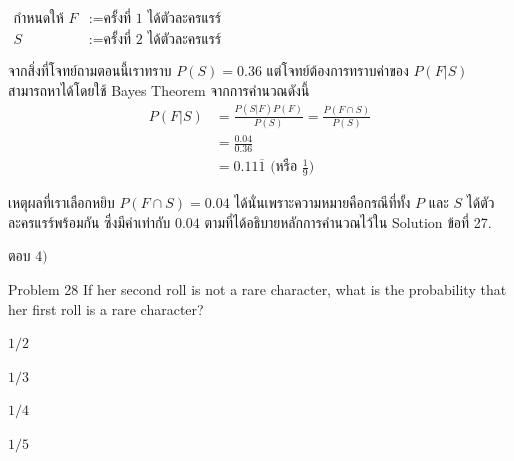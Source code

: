 \documentclass[11pt]{scrartcl}
\begin{document}
\begin{solutionbox}
  \begin{flushleft}
  $\begin{aligned}
    \text{กำหนดให้ } F &:= \text{ครั้งที่ 1 ได้ตัวละครแรร์} \\
    S &:= \text{ครั้งที่ 2 ได้ตัวละครแรร์}
  \end{aligned}$
  \end{flushleft}

  จากสิ่งที่โจทย์ถามตอนนี้เราทราบ $P(S)=0.36$ แต่โจทย์ต้องการทราบค่าของ $P(F|S)$ สามารถหาได้โดยใช้ Bayes Theorem จากการคำนวณดังนี้
  \begin{align*}
      P(F|S) &= \frac{P(S|F)P(F)}{P(S)} = \frac{P(F \cap S)}{P(S)} \\
             &= \frac{0.04}{0.36} \\
             &= 0.11\overline{1} \text{ (หรือ $\frac{1}{9}$)}
  \end{align*}

  เหตุผลที่เราเลือกหยิบ $P(F \cap S) = 0.04$ ได้นั่นเพราะความหมายคือกรณีที่ทั้ง $P$ และ $S$ ได้ตัวละครแรร์พร้อมกัน
  ซึ่งมีค่าเท่ากับ $0.04$ ตามที่ได้อธิบายหลักการคำนวณไว้ใน Solution ข้อที่ 27.

  ตอบ $\boxed{4)}$
\end{solutionbox}

\begin{problembox}{Problem 28}
If her second roll is not a rare character, what is the probability that her first roll is a rare character?
 
\begin{choices}
\item $1/2$
\item $1/3$
\item $1/4$
\item $1/5$
\end{choices}
\end{problembox}
\end{document}
